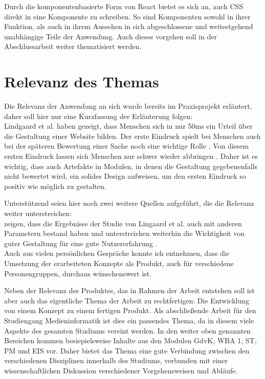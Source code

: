 Durch die komponentenbasierte Form von React bietet es sich an, auch CSS direkt in eine Komponente zu schreiben. So sind Komponenten sowohl in ihrer Funktion, als auch in ihrem Aussehen in sich abgeschlossene und weitestgehend unabhängige Teile der Anwendung. Auch dieses vorgehen soll in der Abschlussarbeit weiter thematisiert werden.

\section{Relevanz des Themas}
Die Relevanz der Anwendung an sich wurde bereits im Praxisprojekt erläutert, daher soll hier nur eine Kurzfassung der Erläuterung folgen:\\
Lindgaard et al. \cite{lindgaard2006attention} haben gezeigt, dass Menschen sich in nur 50ms ein Urteil über die Gestaltung einer Website bilden. Der erste Eindruck spielt bei Menschen auch bei der späteren Bewertung einer Sache noch eine wichtige Rolle \cite{campbell1996fitting}. Von diesem ersten Eindruck lassen sich Menschen nur schwer wieder abbringen \cite{nickerson1998confirmation}.
Daher ist es wichtig, dass auch Artefakte in Modulen, in denen die Gestaltung gegebenenfalls nicht bewertet wird, ein solides Design aufweisen, um den ersten Eindruck so positiv wie möglich zu gestalten.

Unterstützend seien hier noch zwei weitere Quellen aufgeführt, die die Relevanz weiter unterstreichen:\\
\cite{tractinsky2006evaluating} zeigen, dass die Ergebnisse der Studie von Lingaard et al. auch mit anderen Parametern bestand haben und unterstreichen weiterhin die Wichtigkeit von guter Gestaltung für eine gute Nutzererfahrung \cite{tractinsky2000beautiful}.\\
Auch aus vielen persönlichen Gespräche konnte ich entnehmen, dass die Umsetzung der erarbeiteten Konzepte als Produkt, auch für verschiedene Personengruppen, durchaus wünschenswert ist.

Neben der Relevanz des Produktes, das in Rahmen der Arbeit entstehen soll ist aber auch das eigentliche Thema der Arbeit zu rechtfertigen: Die Entwicklung von einem Konzept zu einem fertigen Produkt.
Als abschließende Arbeit für den Studiengang Medieninformatik ist dies ein passendes Thema, da in diesem viele Aspekte des gesamten Studiums vereint werden. In den weiter oben genannten Bereichen kommen besiepielsweise Inhalte aus den Modulen GdvK, WBA 1, ST,  PM und EIS vor. Daher bietet das Thema eine gute Verbindung zwischen den verschiedenen Disziplinen innerhalb des Studiums, verbunden mit einer wissenschaftlichen Diskussion verschiedener Vorgehensweisen und Abläufe.

